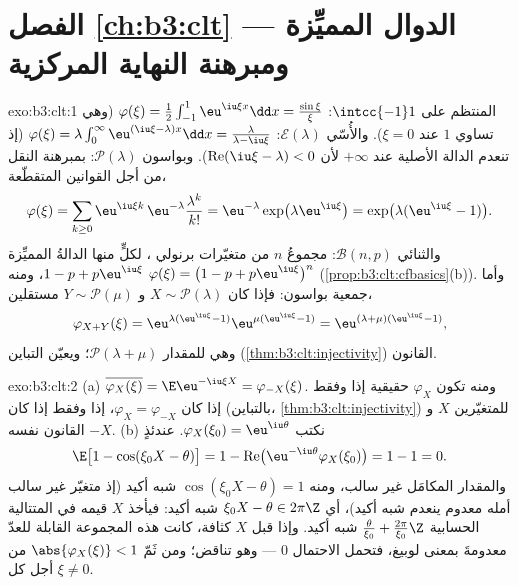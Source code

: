 \section*{الفصل \ref{ch:b3:clt} --- الدوال المميِّزة
ومبرهنة النهاية المركزية}

\begin{solution}{exo:b3:clt:1}
المنتظم على $\intcc{-1}1$: $\varphi(\xi) =
\frac12\int_{-1}^1\eu^{\iu\xi x}\dd x =
\frac{\sin\xi}{\xi}$ (وهي تساوي $1$ عند $\xi = 0$).
والأُسّي $\mathcal E(\lambda)$: $\varphi(\xi) =
\lambda\int_0^\infty\eu^{(\iu\xi - \lambda)x}\dd x =
\frac{\lambda}{\lambda - \iu\xi}$ (إذ تنعدم الدالة الأصلية عند $+\infty$
لأن $\operatorname{Re}(\iu\xi -
\lambda) < 0$). وبواسون $\mathcal P(\lambda)$: بمبرهنة النقل من أجل القوانين
المتقطّعة،
\[
\varphi(\xi) = \sum_{k\geq0}\eu^{\iu\xi
k}\,\eu^{-\lambda}\frac{\lambda^k}{k!}
= \eu^{-\lambda}\exp\bigl(\lambda\eu^{\iu\xi}\bigr)
= \exp\bigl(\lambda(\eu^{\iu\xi} - 1)\bigr).
\]
والثنائي $\mathcal B(n, p)$: مجموعُ $n$ من متغيّرات برنولي ، لكلٍّ
منها الدالةُ المميِّزة $1 - p + p\eu^{\iu\xi}$، ومنه $\varphi(\xi) = \bigl(1 - p + p\eu^{\iu\xi}\bigr)^n$ (\cref{prop:b3:clt:cfbasics}(b)).
وأما جمعية بواسون: فإذا كان $X
\sim \mathcal P(\lambda)$ و $Y \sim \mathcal P(\mu)$ مستقلين،
\[
\varphi_{X+Y}(\xi) = \eu^{\lambda(\eu^{\iu\xi}-1)}
\eu^{\mu(\eu^{\iu\xi}-1)} =
\eu^{(\lambda+\mu)(\eu^{\iu\xi}-1)},
\]
وهي  للمقدار $\mathcal P(\lambda + \mu)$؛ ويعيّن التباين
(\cref{thm:b3:clt:injectivity}) القانون.
\end{solution}

\begin{solution}{exo:b3:clt:2}
(a) $\overline{\varphi_X(\xi)} = \E\eu^{-\iu\xi X} =
\varphi_{-X}(\xi)$. ومنه تكون $\varphi_X$ حقيقية إذا وفقط إذا كان
$\varphi_X = \varphi_{-X}$، إذا وفقط إذا كان (بالتباين، \cref{thm:b3:clt:injectivity}) للمتغيّرين $X$
و $-X$ القانون نفسه.
(b) نكتب $\varphi_X(\xi_0) = \eu^{\iu\theta}$. عندئذٍ
\[
\E\bigl[1 - \cos(\xi_0X - \theta)\bigr]
= 1 - \operatorname{Re}\bigl(\eu^{-\iu\theta}
\varphi_X(\xi_0)\bigr) = 1 - 1 = 0 .
\]
والمقدار المكامَل غير سالب، ومنه $\cos(\xi_0X - \theta) = 1$ شبه أكيد (إذ متغيّر غير
سالب أمله معدوم ينعدم شبه أكيد)، أي $\xi_0X - \theta \in 2\pi\Z$ شبه أكيد: فيأخذ $X$
قيمه في المتتالية الحسابية $\frac{\theta}{\xi_0} + \frac{2\pi}{\xi_0}\Z$ شبه أكيد. وإذا قبل $X$ كثافة،
كانت هذه المجموعة القابلة للعدّ معدومةَ  بمعنى لوبيغ، فتحمل
الاحتمال $0$ --- وهو تناقض؛ ومن ثَمّ $\abs{\varphi_X(\xi)} < 1$ من أجل كل
$\xi \neq 0$.
\end{solution}

